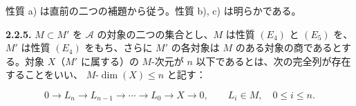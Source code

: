 性質 a) は直前の二つの補題から従う。性質 b), c) は明らかである。

\medskip\noindent\textbf{2.2.5.}\quad
$M\subset M'$ を $\mathcal A$ の対象の二つの集合とし、$M$ は性質
$(E_4)$ と $(E_5)$ を、$M'$ は性質 $(E_4)$ をもち、さらに $M'$ の各対象は
$M$ のある対象の商であるとする。対象 $X$（$M'$ に属する）の $M$-次元が
$n$ 以下であるとは、次の完全列が存在することをいい、
$M\text{-}\dim(X)\leq n$ と記す：

\[
0\longrightarrow L_n\longrightarrow L_{n-1}\longrightarrow\cdots
\longrightarrow L_0\longrightarrow X\longrightarrow0,
\qquad L_i\in M,\quad0\leq i\leq n.
\]
\endgroup
